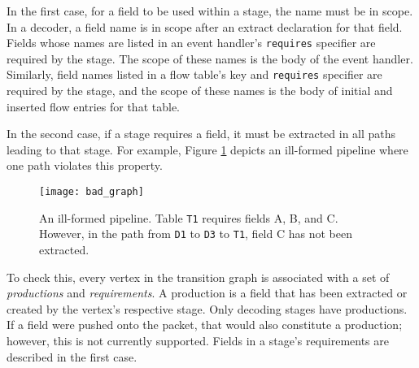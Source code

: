 In the first case, for a field to be used within a stage, the name must be in scope.
In a decoder, a field name is in scope after an extract declaration for that field.
Fields whose names are listed in an event handler's \texttt{requires} specifier are required by the stage. The scope of these names is the body of the event handler.
Similarly, field names listed in a flow table's key and \texttt{requires} specifier are required by the stage, and the scope of these names is the body of initial and inserted flow entries for that table.





In the second case, if a stage requires a field, it must be extracted in all paths leading to that stage.
For example, Figure \ref{fig:bad_graph} depicts an ill-formed pipeline where one path violates this property.

\begin{figure}[ht]
\texttt{[image: bad\_graph]}
\caption{An ill-formed pipeline. Table \texttt{T1} requires fields A, B, and C. However, in the path from \texttt{D1} to \texttt{D3} to \texttt{T1}, field C has not been extracted.}
\label{fig:bad_graph}
\end{figure}

To check this,
every vertex in the transition graph is associated with a set of \textit{productions} and \textit{requirements}.
A production is a field that has been extracted or created by the vertex's respective stage. Only decoding stages have productions. If a field were pushed onto the packet, that would also constitute a production; however, this is not currently supported.
Fields in a stage's requirements are described in the first case. 


